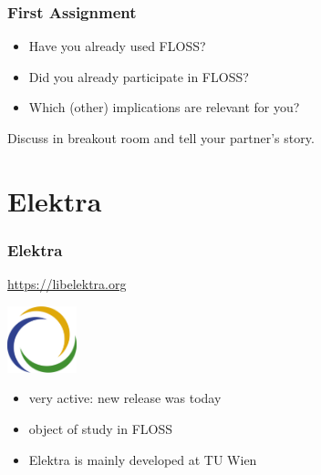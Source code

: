 \begin{assignment}
	\frametitle{First Assignment}
	\begin{itemize}[<+-| alert@+>]
		\item Have you already used FLOSS?
		\item Did you already participate in FLOSS?
		\item Which (other) implications are relevant for you?
	\end{itemize}
	\pause[\thebeamerpauses]

	\begin{task}
	Discuss in breakout room and tell your partner's story.
	\end{task}
\end{assignment}

\breakframe

\section{Elektra}

\begin{frame}
	\frametitle{Elektra}

	\url{https://libelektra.org}

	\hfill \includegraphics[width=2cm]{../figures/logo}

	\vspace{-1cm}
	\begin{itemize}[<+-| alert@+>]
		\item very active: new release was today
		\item object of study in FLOSS
		\item Elektra is mainly developed at TU Wien
	\end{itemize}
\end{frame}

\breakframe


